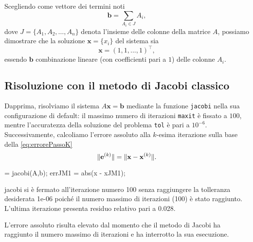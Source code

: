 Scegliendo come vettore dei termini noti
\begin{equation*}
    \mathbf{b} = \sum_ {A_{i} \in J} A_{i},
\end{equation*}
dove $J = \{A_{1}, A_{2},\dots,A_{n}\}$ denota l'insieme delle colonne della matrice $A$, possiamo dimostrare che la soluzione $\mathbf{x}=\{{x}_{i}\}$ 
del sistema sia
\begin{equation*}
    \mathbf{x} = (1, 1, ..., 1)^\top,
\end{equation*}
essendo $\mathbf{b}$ combinazione lineare (con coefficienti pari a $\num{1}$) delle colonne $A_{i}$.
\subsection{Risoluzione con il metodo di Jacobi classico}
Dapprima, risolviamo il sistema $A\mathbf{x}=\mathbf{b}$ mediante la funzione \lstinline{jacobi} nella sua configurazione di default:
il massimo numero di iterazioni \lstinline{maxit} \`e fissato a $\num{100}$, mentre l'accuratezza della soluzione del problema \lstinline{tol} \`e pari a ${10}^{-6}$.\newline
Successivamente, calcoliamo l'errore assoluto alla $k$-esima iterazione sulla base della \eqref{eq:errorePassoK}
\begin{equation*}
\lVert\mathbf{e}^{(k)}\rVert = \lVert\mathbf{x} - \mathbf{x}^{(k)}\rVert.
\end{equation*}
\begin{matlabcode}
     = jacobi(A,b);
    errJM1 = abs(x - xJM1);
\end{matlabcode}
\begin{matlaboutput}
    jacobi si è fermato all'iterazione numero 100 senza
    raggiungere la tolleranza desiderata 1e-06 poiché il
    numero massimo di iterazioni (100) è stato raggiunto.
    L'ultima iterazione presenta residuo relativo 
    pari a 0.028.
\end{matlaboutput}
L'errore assoluto risulta elevato dal momento che il metodo di Jacobi ha raggiunto il numero massimo di iterazioni e ha interrotto la sua esecuzione.

